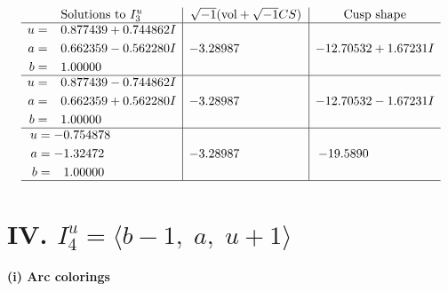\documentclass[1p]{elsarticle_modified}
\theoremstyle{definition}
\newcommand{\I}{\sqrt{-1}}
\begin{document}
$$\begin{array}{c|c|c}  
\text{Solutions to }I^u_{3}& \I (\text{vol} + \sqrt{-1}CS) & \text{Cusp shape}\\
 \hline 
\begin{aligned}
u &= \phantom{-}0.877439 + 0.744862 I \\
a &= \phantom{-}0.662359 - 0.562280 I \\
b &= \phantom{-}1.00000\phantom{ +0.000000I}\end{aligned}
 & -3.28987\phantom{ +0.000000I} & -12.70532 + 1.67231 I \\ \hline\begin{aligned}
u &= \phantom{-}0.877439 - 0.744862 I \\
a &= \phantom{-}0.662359 + 0.562280 I \\
b &= \phantom{-}1.00000\phantom{ +0.000000I}\end{aligned}
 & -3.28987\phantom{ +0.000000I} & -12.70532 - 1.67231 I \\ \hline\begin{aligned}
u &= -0.754878\phantom{ +0.000000I} \\
a &= -1.32472\phantom{ +0.000000I} \\
b &= \phantom{-}1.00000\phantom{ +0.000000I}\end{aligned}
 & -3.28987\phantom{ +0.000000I} & -19.5890\phantom{ +0.000000I}\\
 \hline 
 \end{array}$$\newpage\newpage\renewcommand{\arraystretch}{1}
\centering \section*{IV. $I^u_{4}= \langle b-1,\;a,\;u+1 \rangle$}
\flushleft \textbf{(i) Arc colorings}\\
\end{document}
